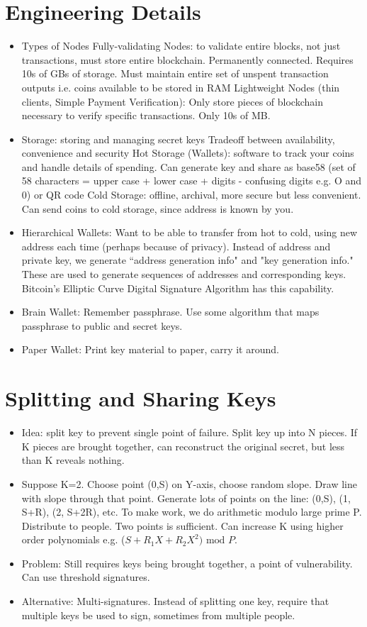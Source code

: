 \documentclass{article}
\begin{document}
\section{Engineering Details}
\begin{itemize}
\item Types of Nodes
\subitem Fully-validating Nodes: to validate entire blocks, not just transactions, must store entire blockchain. Permanently connected. Requires 10s of GBs of storage. Must maintain entire set of unspent transaction outputs i.e. coins available to be stored in RAM
\subitem Lightweight Nodes (thin clients, Simple Payment Verification): Only store pieces of blockchain necessary to verify specific transactions. Only 10s of MB.
\item Storage: storing and managing secret keys
\subitem Tradeoff between availability, convenience and security
\subitem Hot Storage (Wallets): software to track your coins and handle details of spending. Can generate key and share as base58 (set of 58 characters = upper case + lower case + digits - confusing digits e.g. O and 0) or QR code
\subitem Cold Storage: offline, archival, more secure but less convenient. Can send coins to cold storage, since address is known by you.
\item Hierarchical Wallets: Want to be able to transfer from hot to cold, using new address each time (perhaps because of privacy). Instead of address and private key, we generate ``address generation info" and "key generation info." These are used to generate sequences of addresses and corresponding keys. Bitcoin's Elliptic Curve Digital Signature Algorithm has this capability.
\item Brain Wallet: Remember passphrase. Use some algorithm that maps passphrase to public and secret keys.
\item Paper Wallet: Print key material to paper, carry it around.
\end{itemize}

\section{Splitting and Sharing Keys}
\begin{itemize}
\item Idea: split key to prevent single point of failure. Split key up into N pieces. If K pieces are brought together, can reconstruct the original secret, but less than K reveals nothing.
\item Suppose K=2. Choose point (0,S) on Y-axis, choose random slope. Draw line with slope through that point. Generate lots of points on the line: (0,S), (1, S+R), (2, S+2R), etc. To make work, we do arithmetic modulo large prime P. Distribute to people. Two points is sufficient.
\subitem Can increase K using higher order polynomials e.g. ($S + R_1X + R_2X^2) \text{ mod } P$.
\item Problem: Still requires keys being brought together, a point of vulnerability. Can use threshold signatures.
\item Alternative: Multi-signatures. Instead of splitting one key, require that multiple keys be used to sign, sometimes from multiple people.
\end{itemize}
\end{document}
